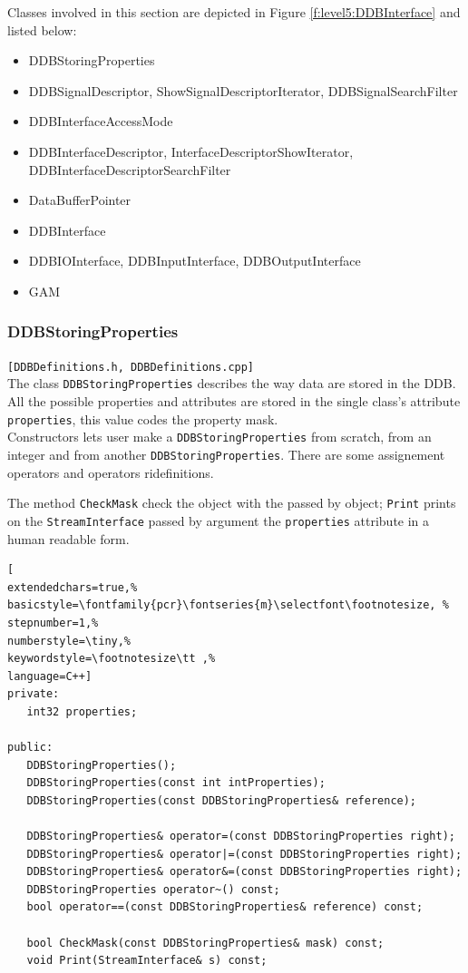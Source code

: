 Classes involved in this section are depicted in Figure \ref{f:level5:DDBInterface} and listed below:
\begin{itemize}
 \item DDBStoringProperties
 \item DDBSignalDescriptor, ShowSignalDescriptorIterator, DDBSignalSearchFilter
 \item DDBInterfaceAccessMode
 \item DDBInterfaceDescriptor, InterfaceDescriptorShowIterator, DDBInterfaceDescriptorSearchFilter
 \item DataBufferPointer
 \item DDBInterface
 \item DDBIOInterface, DDBInputInterface, DDBOutputInterface
 \item GAM
\end{itemize}



\subsubsection{DDBStoringProperties}
\texttt{[DDBDefinitions.h, DDBDefinitions.cpp]}\\
The class \texttt{DDBStoringProperties} describes the way data are stored in the DDB. All the possible properties and attributes are stored in the single class's attribute \texttt{properties}, this value codes the property mask.\\


Constructors lets user make a \texttt{DDBStoringProperties} from scratch, from an integer and from another \texttt{DDBStoringProperties}. There are some assignement operators and operators ridefinitions.


The method \texttt{CheckMask} check the object with the passed by object; \texttt{Print} prints on the \texttt{StreamInterface} passed by argument the \texttt{properties} attribute in a human readable form.

\begin{lstlisting}[
extendedchars=true,%
basicstyle=\fontfamily{pcr}\fontseries{m}\selectfont\footnotesize, %
stepnumber=1,%
numberstyle=\tiny,%
keywordstyle=\footnotesize\tt ,%
language=C++]
private:
   int32 properties;

public:
   DDBStoringProperties();
   DDBStoringProperties(const int intProperties);
   DDBStoringProperties(const DDBStoringProperties& reference);

   DDBStoringProperties& operator=(const DDBStoringProperties right);
   DDBStoringProperties& operator|=(const DDBStoringProperties right);
   DDBStoringProperties& operator&=(const DDBStoringProperties right);
   DDBStoringProperties operator~() const;
   bool operator==(const DDBStoringProperties& reference) const;

   bool CheckMask(const DDBStoringProperties& mask) const;
   void Print(StreamInterface& s) const;
\end{lstlisting}

